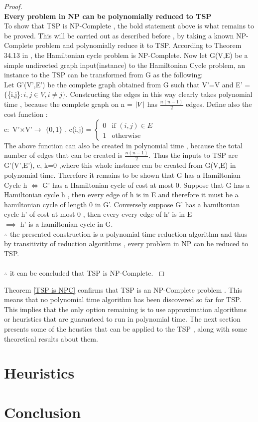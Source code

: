 \documentclass{article}
\begin{document}
\begin{proof}
\\
\textbf{Every problem in NP can be polynomially reduced to TSP}\\
To show that TSP is NP-Complete , the bold statement above is what remains to be proved. This will be carried out as described before , by taking a known NP-Complete problem and polynomially reduce it to TSP. According to Theorem 34.13 in \cite{cormen_leiserson_rivest_stein}, the Hamiltonian cycle problem is NP-Complete. Now let G(V,E) be a simple undirected graph input(instance) to the Hamiltonian Cycle problem, an instance to the TSP can be transformed from G as the following:\\
Let G'(V',E') be the complete graph obtained from G such that V'=V and E' = $\{$\{i,j\}$ : i,j \in V , i \ne j \}$. Constructing the edges in this way clearly takes polynomial time , because the complete graph on n = $\abs{V}$ has $\frac{n(n-1)}{2}$ edges. Define also the cost function :\\
c$\colon$ V'$\times$V'$\to$ $\{0,1\}$ , c(i,j) = $\begin{cases} 0& \text{if } (i,j) \in E\\ 1              & \text{otherwise} \end{cases}$\\
The above function can also be created in polynomial time , because the total number of edges that can be created is $\frac{n(n-1)}{2}$. Thus the inputs to TSP are G'(V',E'), c, k=0 ,where this whole instance can be created from G(V,E) in polynomial time. Therefore it remains to be shown that G has a Hamiltonian Cycle h $\iff$ G' has a Hamiltonian cycle of cost at most 0. Suppose that G has a Hamiltonian cycle h , then every edge of h is in E and therefore it must be a hamiltonian cycle of length 0 in G'. Conversely suppose G' has a hamiltonian cycle h' of cost at most 0 , then every every edge of h' is in E\\
$\implies$ h' is a hamiltonian cycle in G.\\
$\therefore$ the presented construction is a polynomial time reduction algorithm and thus by transitivity of reduction algorithms , every problem in NP can be reduced to TSP.\\
\\
$\therefore$ it can be concluded that TSP is NP-Complete. \cite{cormen_leiserson_rivest_stein}
\end{proof}
Theorem \ref{TSP is NPC} confirms that TSP is an NP-Complete problem . This means that no polynomial time algorithm has been discovered so far for TSP. This implies that the only option remaining is to use approximation algorithms or heuristics that are guaranteed to run in polynomial time. The next section presents some of the heustics that can be applied to the TSP , along with some theoretical results about them.
\newpage
\section{Heuristics}
\newpage
\section{Conclusion}
\newpage


\end{document}
